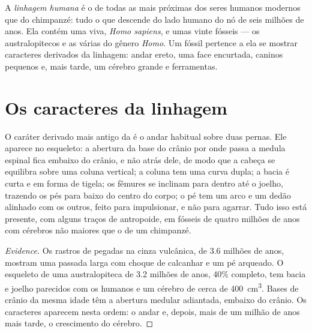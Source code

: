 \begin{definition}\label{def:g12:human-evolution:lineage}
A \emph{linhagem humana} é o  de todas as
 mais próximas dos seres humanos modernos que do chimpanzé:
tudo o que descende do lado humano do nó de seis milhões de anos. Ela
contém uma  viva, \emph{Homo sapiens}, e umas vinte fósseis ---
os australopitecos e as várias  do gênero \emph{Homo}. Um
fóssil pertence a ela se mostrar caracteres derivados da linhagem:
andar ereto, uma face encurtada, caninos pequenos e, mais tarde, um
cérebro grande e ferramentas.
\end{definition}

\section{Os caracteres da linhagem}

\begin{proposition}\label{prop:g12:human-evolution:bipedalism}
O caráter derivado mais antigo da  é o andar habitual
sobre duas pernas. Ele aparece no esqueleto: a abertura da base do
crânio por onde passa a medula espinal fica embaixo do crânio, e não
atrás dele, de modo que a cabeça se equilibra sobre uma coluna
vertical; a coluna tem uma curva dupla; a bacia é curta e em forma de
tigela; os fêmures se inclinam para dentro até o joelho, trazendo os
pés para baixo do centro do corpo; o pé tem um arco e um dedão alinhado
com os outros, feito para impulsionar, e não para agarrar. Tudo isso
está presente, com alguns traços de antropoide, em fósseis de quatro
milhões de anos com cérebros não maiores que o de um chimpanzé.
\end{proposition}
\begin{proof}[Evidence]
Os rastros de pegadas na cinza vulcânica, de 3.6 milhões de anos,
mostram uma passada larga com choque de calcanhar e um pé arqueado. O
esqueleto de uma australopiteca de 3.2 milhões de anos, 40\% completo,
tem bacia e joelho parecidos com os humanos e um cérebro de cerca de
\qty{400}{cm^3}. Bases de crânio da mesma idade têm a abertura medular
adiantada, embaixo do crânio. Os caracteres aparecem nesta ordem: o
andar e, depois, mais de um milhão de anos mais tarde, o crescimento do cérebro.
\end{proof}

